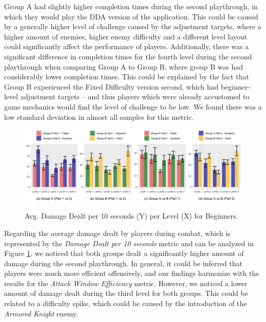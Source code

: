 Group A had slightly higher completion times during the second playthrough, in which they would play the DDA version of the application. This could be caused by a generally higher level of challenge caused by the adjustment targets, where a higher amount of enemies, higher enemy difficulty and a different level layout could significantly affect the performance of players. Additionally, there was a significant difference in completion times for the fourth level during the second playthrough when comparing Group A to Group B, where group B was had considerably lower completion times. This could be explained by the fact that Group B experienced the Fixed Difficulty version second, which had beginner-level adjustment targets -- and thus players which were already accustomed to game mechanics would find the level of challenge to be low. We found there was a low standard deviation in almost all samples for this metric.

\begin{figure}[ht]
    \begin{center}
    \caption{Avg. Damage Dealt per 10 seconds (Y) per Level (X) for Beginners.}
        \includegraphics[width=\textwidth]{figures/damage_dealt_per_10s-beginner_players.png}
        \label{fig:result-metric-beginners-damage-dealt-per-10s}
    \end{center}
\end{figure}

Regarding the average damage dealt by players during combat, which is represented by the \emph{Damage Dealt per 10 seconds} metric and can be analyzed in Figure \ref{fig:result-metric-beginners-damage-dealt-per-10s}, we noticed that both groups dealt a significantly higher amount of damage during the second playthrough. In general, it could be inferred that players were much more efficient offensively, and our findings harmonize with the results for the \emph{Attack Window Efficiency} metric. However, we noticed a lower amount of damage dealt during the third level for both groups. This could be related to a difficulty spike, which could be caused by the introduction of the \emph{Armored Knight} enemy.


